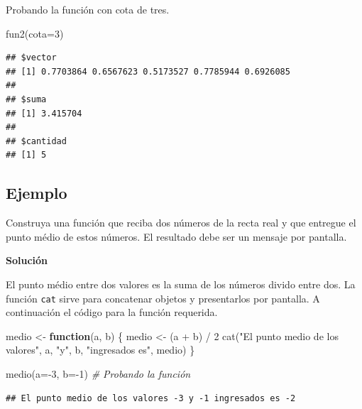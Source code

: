 \documentclass[
]{book}
\makeatletter
\newenvironment{Shaded}{\begin{snugshade}}{\end{snugshade}}
\newcommand{\AttributeTok}[1]{\textcolor[rgb]{0.77,0.63,0.00}{#1}}
\newcommand{\CommentTok}[1]{\textcolor[rgb]{0.56,0.35,0.01}{\textit{#1}}}
\newcommand{\ControlFlowTok}[1]{\textcolor[rgb]{0.13,0.29,0.53}{\textbf{#1}}}
\newcommand{\DecValTok}[1]{\textcolor[rgb]{0.00,0.00,0.81}{#1}}
\newcommand{\FunctionTok}[1]{\textcolor[rgb]{0.00,0.00,0.00}{#1}}
\newcommand{\NormalTok}[1]{#1}
\newcommand{\OtherTok}[1]{\textcolor[rgb]{0.56,0.35,0.01}{#1}}
\newcommand{\SpecialCharTok}[1]{\textcolor[rgb]{0.00,0.00,0.00}{#1}}
\newcommand{\StringTok}[1]{\textcolor[rgb]{0.31,0.60,0.02}{#1}}
\newenvironment{kframe}{%
\medskip{}
\setlength{\fboxsep}{.8em}
 \def\at@end@of@kframe{}%
 \ifinner\ifhmode%
  \def\at@end@of@kframe{\end{minipage}}%
  \begin{minipage}{\columnwidth}%
 \fi\fi%
 \def\FrameCommand##1{\hskip\@totalleftmargin \hskip-\fboxsep
 \colorbox{shadecolor}{##1}\hskip-\fboxsep
     \hskip-\linewidth \hskip-\@totalleftmargin \hskip\columnwidth}%
 \MakeFramed {\advance\hsize-\width
   \@totalleftmargin\z@ \linewidth\hsize
   \@setminipage}}%
 {\par\unskip\endMakeFramed%
 \at@end@of@kframe}
\renewenvironment{Shaded}{\begin{kframe}}{\end{kframe}}
\makeatother
\begin{document}
Probando la función con cota de tres.

\begin{Shaded}
\begin{Highlighting}[]
\FunctionTok{fun2}\NormalTok{(}\AttributeTok{cota=}\DecValTok{3}\NormalTok{)}
\end{Highlighting}
\end{Shaded}

\begin{verbatim}
## $vector
## [1] 0.7703864 0.6567623 0.5173527 0.7785944 0.6926085
## 
## $suma
## [1] 3.415704
## 
## $cantidad
## [1] 5
\end{verbatim}

\hypertarget{ejemplo-23}{%
\subsection*{Ejemplo}\label{ejemplo-23}}

Construya una función que reciba dos números de la recta real y que entregue el punto médio de estos números. El resultado debe ser un mensaje por pantalla.

\textbf{Solución}

El punto médio entre dos valores es la suma de los números divido entre dos. La función \texttt{cat} sirve para concatenar objetos y presentarlos por pantalla. A continuación el código para la función requerida.

\begin{Shaded}
\begin{Highlighting}[]
\NormalTok{medio }\OtherTok{\textless{}{-}} \ControlFlowTok{function}\NormalTok{(a, b) \{}
\NormalTok{  medio }\OtherTok{\textless{}{-}}\NormalTok{ (a }\SpecialCharTok{+}\NormalTok{ b) }\SpecialCharTok{/} \DecValTok{2}
  \FunctionTok{cat}\NormalTok{(}\StringTok{"El punto medio de los valores"}\NormalTok{, a, }\StringTok{"y"}\NormalTok{, b,}
      \StringTok{"ingresados es"}\NormalTok{, medio)}
\NormalTok{\}}

\FunctionTok{medio}\NormalTok{(}\AttributeTok{a=}\SpecialCharTok{{-}}\DecValTok{3}\NormalTok{, }\AttributeTok{b=}\SpecialCharTok{{-}}\DecValTok{1}\NormalTok{)  }\CommentTok{\# Probando la función}
\end{Highlighting}
\end{Shaded}

\begin{verbatim}
## El punto medio de los valores -3 y -1 ingresados es -2
\end{verbatim}
\end{document}
